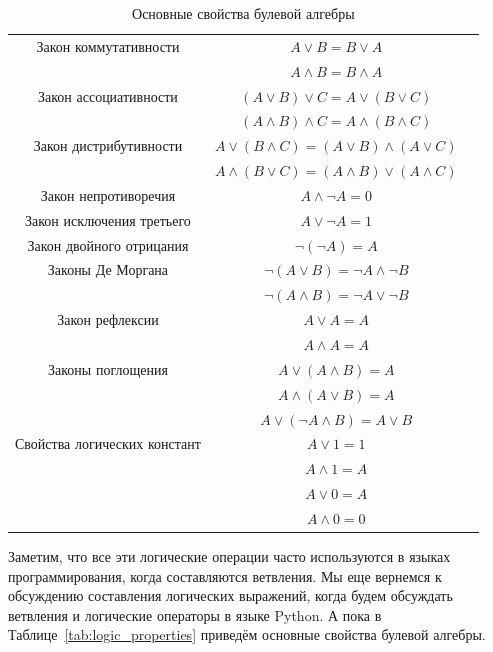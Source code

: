 \begin{table}[!ht]
\centering
\begin{tabular}{|c|c|c|}
\hline
Закон коммутативности     & $A \vee B = B \vee A$ \\
                          & $A \wedge B = B \wedge A$ \\\hline
Закон ассоциативности     & $(A \vee B) \vee C = A \vee (B \vee C)$ \\
                          & $(A \wedge B) \wedge C = A \wedge (B \wedge C)$ \\\hline
Закон дистрибутивности    & $A \vee (B \wedge C) = (A \vee B) \wedge (A \vee C)$ \\
                          & $A \wedge (B \vee C) = (A \wedge B) \vee (A \wedge C)$ \\\hline
Закон непротиворечия      & $A \wedge \lnot A = 0$ \\\hline
Закон исключения третьего & $A \vee \lnot A = 1$ \\\hline
Закон двойного отрицания  & $\lnot(\lnot A) = A$ \\\hline
Законы Де Моргана         & $\lnot (A \vee B) = \lnot A \wedge \lnot B$ \\
                          & $\lnot (A \wedge B) = \lnot A \vee \lnot B$ \\\hline
Закон рефлексии           & $A \vee A = A$ \\
                          & $A \wedge A = A$ \\\hline
Законы поглощения         & $A \vee (A \wedge B) = A$ \\
                          & $A \wedge (A \vee B) = A$ \\
                          & $A \vee (\lnot A \wedge B) = A \vee B$ \\\hline
Свойства логических констант & $A \vee 1 = 1$ \\
                             & $A \wedge 1 = A$ \\
                             & $A \vee 0 = A$ \\
                             & $A \wedge 0 = 0$ \\\hline
\end{tabular}
\label{tab:logic:properties}
\caption{Основные свойства булевой алгебры}
\end{table}

Заметим, что все эти логические операции часто используются в языках 
программирования, когда составляются ветвления. Мы еще вернемся 
к обсуждению составления логических выражений, когда будем обсуждать
ветвления и логические операторы в языке Python. А пока в 
Таблице~\ref{tab:logic_properties} приведём основные свойства булевой
алгебры.

